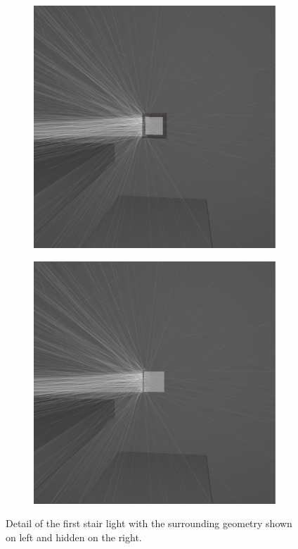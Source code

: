 \begin{figure}
	\centering
	\begin{subfigure}[t]{0.24\linewidth}
		\includegraphics[width=\textwidth]{chapters/chapter_results/b_light}
	\end{subfigure}
	\begin{subfigure}[t]{0.24\linewidth}
		\includegraphics[width=\textwidth]{chapters/chapter_results/b_lightoff}
	\end{subfigure}

	\caption{Detail of the first stair light with the surrounding geometry shown on left and hidden on the right.}
	\label{couple2light}
\end{figure}

